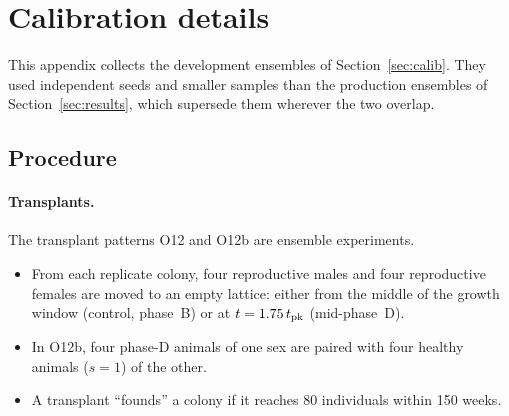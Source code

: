 \section{Calibration details}
\label{app:calib}

This appendix collects the development ensembles of Section~\ref{sec:calib}. They used independent seeds and
smaller samples than the production ensembles of Section~\ref{sec:results}, which supersede them wherever the two
overlap.

\subsection{Procedure}
\label{app:calib-procedure}

\paragraph{Transplants.}
The transplant patterns O12 and O12b are ensemble experiments.
\begin{itemize}
  \item From each replicate colony, four reproductive males and four reproductive females are moved to an
    empty lattice: either from the middle of the growth window (control, phase~B) or at
    $t=1.75\,t_{\rm pk}$ (mid-phase~D).
  \item In O12b, four phase-D animals of one sex are paired with four healthy animals ($s=1$) of the other.
  \item A transplant ``founds'' a colony if it reaches 80 individuals within 150 weeks.
\end{itemize}

